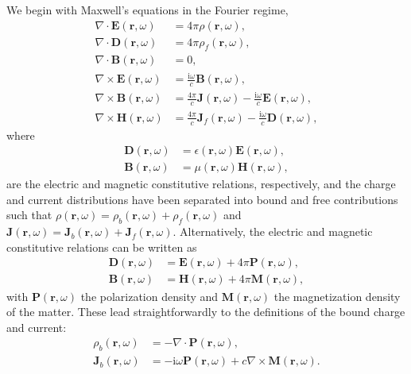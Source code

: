 \documentclass{article}
\begin{document}
We begin with Maxwell's equations in the Fourier regime,
\begin{equation}
\begin{split}
\nabla\cdot\mathbf{E}(\mathbf{r},\omega) &= 4\pi\rho(\mathbf{r},\omega),\\
\nabla\cdot\mathbf{D}(\mathbf{r},\omega) &= 4\pi\rho_f(\mathbf{r},\omega),\\
\nabla\cdot\mathbf{B}(\mathbf{r},\omega) &= 0,\\
\nabla\times\mathbf{E}(\mathbf{r},\omega) &= \frac{\mathrm{i}\omega}{c}\mathbf{B}(\mathbf{r},\omega),\\
\nabla\times\mathbf{B}(\mathbf{r},\omega) &= \frac{4\pi}{c}\mathbf{J}(\mathbf{r},\omega) - \frac{\mathrm{i}\omega}{c}\mathbf{E}(\mathbf{r},\omega),\\
\nabla\times\mathbf{H}(\mathbf{r},\omega) &= \frac{4\pi}{c}\mathbf{J}_f(\mathbf{r},\omega) - \frac{\mathrm{i}\omega}{c}\mathbf{D}(\mathbf{r},\omega),
\end{split}
\end{equation}
where
\begin{equation}
\begin{split}
\mathbf{D}(\mathbf{r},\omega) &= \epsilon(\mathbf{r},\omega)\mathbf{E}(\mathbf{r},\omega),\\
\mathbf{B}(\mathbf{r},\omega) &= \mu(\mathbf{r},\omega)\mathbf{H}(\mathbf{r},\omega),
\end{split}
\end{equation}
are the electric and magnetic constitutive relations, respectively, and the charge and current distributions have been separated into bound and free contributions such that $\rho(\mathbf{r},\omega) = \rho_b(\mathbf{r},\omega) + \rho_f(\mathbf{r},\omega)$ and $\mathbf{J}(\mathbf{r},\omega) = \mathbf{J}_b(\mathbf{r},\omega) + \mathbf{J}_f(\mathbf{r},\omega)$. Alternatively, the electric and magnetic constitutive relations can be written as
\begin{equation}
\begin{split}
\mathbf{D}(\mathbf{r},\omega) &= \mathbf{E}(\mathbf{r},\omega) + 4\pi\mathbf{P}(\mathbf{r},\omega),\\
\mathbf{B}(\mathbf{r},\omega) &= \mathbf{H}(\mathbf{r},\omega) + 4\pi\mathbf{M}(\mathbf{r},\omega),
\end{split}
\end{equation}
with $\mathbf{P}(\mathbf{r},\omega)$ the polarization density and $\mathbf{M}(\mathbf{r},\omega)$ the magnetization density of the matter. These lead straightforwardly to the definitions of the bound charge and current:
\begin{equation}
\begin{split}
\rho_b(\mathbf{r},\omega) &= -\nabla\cdot\mathbf{P}(\mathbf{r},\omega),\\
\mathbf{J}_b(\mathbf{r},\omega) &= -\mathrm{i}\omega\mathbf{P}(\mathbf{r},\omega) + c\nabla\times\mathbf{M}(\mathbf{r},\omega).
\end{split}
\end{equation}
\end{document}
